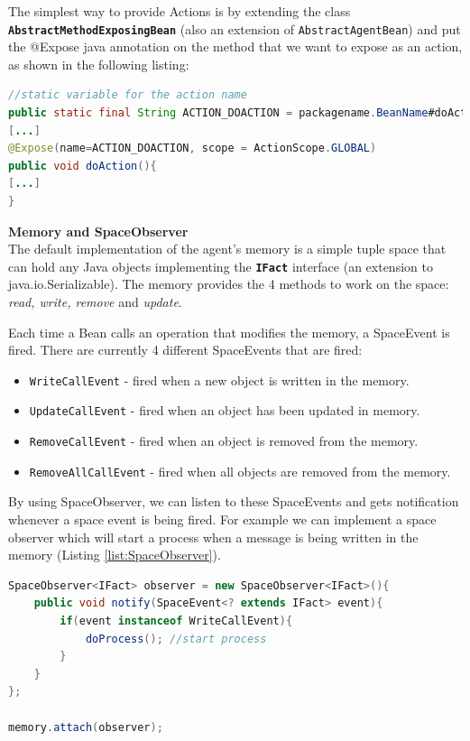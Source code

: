 The simplest way to provide Actions is by extending the class \textbf{\texttt{AbstractMethodExposingBean}} (also an extension of \texttt{AbstractAgentBean}) and put the @Expose java annotation on the method that we want to expose as an action, as shown in the following listing:
\begin{lstlisting}[language = Java, caption = Providing an Action]
//static variable for the action name
public static final String ACTION_DOACTION = packagename.BeanName#doAction;
[...]
@Expose(name=ACTION_DOACTION, scope = ActionScope.GLOBAL)
public void doAction(){
[...]
}
\end{lstlisting}

\textbf{Memory and SpaceObserver}\\
The default implementation of the agent's memory is a simple tuple space that can hold any Java objects implementing the \textbf{\texttt{IFact}} interface (an extension to java.io.Serializable). The memory provides the 4 methods to work on the space:\textit{ read, write, remove} and \textit{update}.

Each time a Bean calls an operation that modifies the memory, a SpaceEvent is fired. There are currently 4 different SpaceEvents that are fired:
\begin{itemize}
	\item \texttt{WriteCallEvent} - fired when a new object is written in the memory.
	\item \texttt{UpdateCallEvent} - fired when an object has been updated in memory.
	\item \texttt{RemoveCallEvent} - fired when an object is removed from the memory.
	\item \texttt{RemoveAllCallEvent} - fired when all objects are removed from the memory.
\end{itemize}

By using SpaceObserver, we can listen to these SpaceEvents and gets notification whenever a space event is being fired.
For example we can implement a space observer which will start a process when a message is being written in the memory (Listing \ref{list:SpaceObserver}). 
\begin{lstlisting}[language = Java, caption = A SpaceObserver, label = list:SpaceObserver]
SpaceObserver<IFact> observer = new SpaceObserver<IFact>(){
	public void notify(SpaceEvent<? extends IFact> event){
		if(event instanceof WriteCallEvent){
			doProcess(); //start process
		}
	}
};

memory.attach(observer);
\end{lstlisting}

